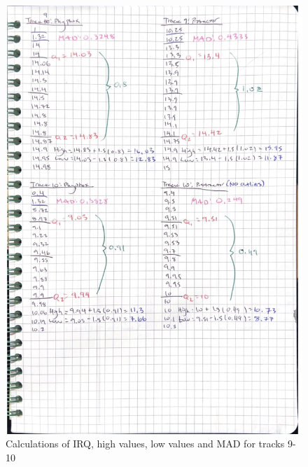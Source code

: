 \documentclass[idxtotoc,hyperref,openany]{labbook} %
\begin{document}
\begin{figure}[H] %
\begin{center}
\includegraphics[width=0.9\linewidth]{images/Lab.01/PhyProTrack9-10.png}
\end{center}
\caption{Calculations of IRQ, high values, low values and MAD for tracks 9-10}
\label{fig:Track9-10PhyphoxProtractor}
\end{figure}
\end{document}
